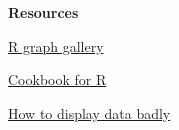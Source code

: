 \documentclass[xcolor=dvipsnames , 11pt]{beamer}
\begin{document}
\begin{frame}[fragile]{\textbf{Resources}}


\href{http://rgraphgallery.blogspot.com/}{  R graph gallery} 

\href{http://www.cookbook-r.com/Graphs/}{  Cookbook for R}

\href{http://www.jstor.org/discover/10.2307/2683253?uid=3738336&uid=2&uid=4&sid=21103314330371}{  How to display data badly}


\end{frame}
\end{document}
